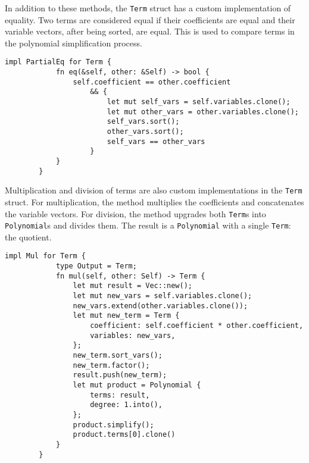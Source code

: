 In addition to these methods, the \verb|Term| struct has a custom implementation of equality. Two terms are considered equal if their coefficients are equal and their variable vectors, after being sorted, are equal. This is used to compare terms in the polynomial simplification process.

    \begin{lstlisting}[caption={The implementation of \texttt{PartialEq} for the \texttt{Term} struct}, label={lst:term-eq}]
        impl PartialEq for Term {
            fn eq(&self, other: &Self) -> bool {
                self.coefficient == other.coefficient
                    && {
                        let mut self_vars = self.variables.clone();
                        let mut other_vars = other.variables.clone();
                        self_vars.sort();
                        other_vars.sort();
                        self_vars == other_vars
                    }
            }
        }
    \end{lstlisting}

Multiplication and division of terms are also custom implementations in the \verb|Term| struct. For multiplication, the method multiplies the coefficients and concatenates the variable vectors. For division, the method upgrades both \verb|Term|s into \verb|Polynomial|s and divides them. The result is a \verb|Polynomial| with a single \verb|Term|: the quotient.

    \begin{lstlisting}[caption={The implementation of the multiplication operation for the \texttt{Term} struct}, label={lst:term-mul}]
        impl Mul for Term {
            type Output = Term;
            fn mul(self, other: Self) -> Term {
                let mut result = Vec::new();
                let mut new_vars = self.variables.clone();
                new_vars.extend(other.variables.clone());
                let mut new_term = Term {
                    coefficient: self.coefficient * other.coefficient,
                    variables: new_vars,
                };
                new_term.sort_vars();
                new_term.factor();
                result.push(new_term);
                let mut product = Polynomial {
                    terms: result,
                    degree: 1.into(),
                };
                product.simplify();
                product.terms[0].clone()
            }
        }
    \end{lstlisting}

